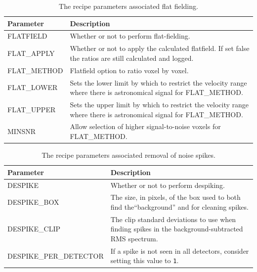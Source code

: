 \documentclass[11pt,oneside,chapters]{starlink}
\begin{document}
\begin{table}[h!]
\begin{small}
\begin{tabular}{|p{6.8cm}|p{8.6cm}|}
\hline
\textbf{Parameter} & \textbf{Description} \\
\hline
FLATFIELD & Whether or not to perform flat-fielding.\\
FLAT\_APPLY & Whether or not to apply the calculated flatfield.  If set false
              the ratios are still calculated and logged.\\
FLAT\_METHOD & Flatfield option to ratio voxel by voxel.\\
FLAT\_LOWER & Sets the lower limit by which to restrict the velocity range where there is
              astronomical signal for FLAT\_METHOD.\\
FLAT\_UPPER & Sets the upper limit by which to restrict the velocity range where there is
              astronomical signal for FLAT\_METHOD.\\
MINSNR & Allow selection of higher signal-to-noise voxels for FLAT\_METHOD. \\
\hline
\end{tabular}
\end{small}
\caption{\label{tab:flat_params}
  The recipe parameters associated flat fielding.}
\end{table}

\begin{table}[h!]
\begin{small}
\begin{tabular}{|p{6.8cm}|p{8.6cm}|}
\hline
\textbf{Parameter} & \textbf{Description} \\
\hline
DESPIKE & Whether or not to perform despiking.\\
DESPIKE\_BOX & The size, in pixels, of the box used to both find the``background'' and
               for cleaning spikes.\\
DESPIKE\_CLIP & The clip standard deviations to use when finding spikes in the
                background-subtracted RMS spectrum.\\
DESPIKE\_PER\_DETECTOR & If a spike is not seen in all detectors, consider setting this
                         value to \texttt{1}.\\
\hline
\end{tabular}
\end{small}
\caption{\label{tab:despike_params}
  The recipe parameters associated removal of noise spikes.}
\end{table}
\end{document}

